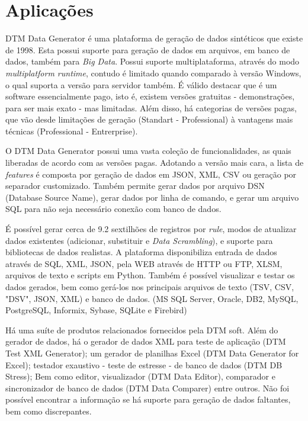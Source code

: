 \documentclass[
	12pt,				%
	openright,			%
	twoside,			%
	a4paper,			%
	english,			%
	brazil				%
	]{abntex2}
\begin{document}
	\section{Aplicações}

		DTM Data Generator \cite{DTMDataGenerator} é uma plataforma de geração de dados sintéticos que existe de 1998.
		Esta possui suporte para geração de dados em arquivos, em banco de dados, também para \emph{Big Data}.
		Possui suporte multiplataforma, através do modo \emph{multiplatform runtime}, contudo é limitado quando comparado à versão Windows, o qual suporta a versão para servidor também.
		É válido destacar que é um software essencialmente pago, isto é, existem versões gratuitas - demonstrações, para ser mais exato - mas limitadas.
		Além disso, há categorias de versões pagas, que vão desde limitações de geração (Standart - Professional) à vantagens mais técnicas (Professional - Entrerprise).
		\par
		O DTM Data Generator possui uma vasta coleção de funcionalidades, as quais liberadas de acordo com as versões pagas.
		Adotando a versão mais cara, a lista de \emph{features} é composta por geração de dados em JSON, XML, CSV ou geração por separador customizado.
		Também permite gerar dados por arquivo DSN (Database Source Name), gerar dados por linha de comando, e gerar um arquivo SQL para não seja necessário conexão com banco de dados.
		\par
		É possível gerar cerca de 9.2 sextilhões de registros por \emph{rule}, modos de atualizar dados existentes (adicionar, substituir e \emph{Data Scrambling}), e suporte para bibliotecas de dados realistas.
		A plataforma disponibiliza entrada de dados através de SQL, XML, JSON, pela WEB através de HTTP ou FTP, XLSM, arquivos de texto e scripts em Python.
		Também é possível visualizar e testar os dados gerados, bem como gerá-los nos principais arquivos de texto (TSV, CSV, "DSV", JSON, XML) e banco de dados. (MS SQL Server, Oracle, DB2, MySQL, PostgreSQL, Informix, Sybase, SQLite e Firebird) 
		\par
		Há uma suíte de produtos relacionados fornecidos pela DTM soft. 
		Além do gerador de dados, 
			há o gerador de dados XML para teste de aplicação (DTM Test XML Generator);
			um gerador de planilhas Excel (DTM Data Generator for Excel);
			testador exaustivo - teste de estresse - de banco de dados (DTM DB Stress);
			Bem como editor, visualizador (DTM Data Editor), comparador e sincronizador de banco de dados (DTM Data Comparer) entre outros.
		Não foi possível encontrar a informação se há suporte para geração de dados faltantes, bem como discrepantes.
\end{document}
